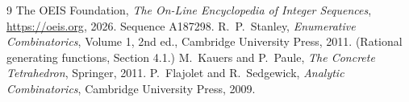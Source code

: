 \documentclass[11pt,a4paper]{article}
\theoremstyle{plain}
\theoremstyle{definition}
\begin{document}
\begin{thebibliography}{9}
 The OEIS Foundation, \emph{The On-Line Encyclopedia of Integer
Sequences}, \url{https://oeis.org}, 2026. Sequence A187298.
 R.~P.~Stanley, \emph{Enumerative Combinatorics}, Volume 1, 2nd ed.,
Cambridge University Press, 2011. (Rational generating functions, Section 4.1.)
 M.~Kauers and P.~Paule, \emph{The Concrete Tetrahedron}, Springer, 2011.
 P.~Flajolet and R.~Sedgewick, \emph{Analytic Combinatorics}, Cambridge
University Press, 2009.
\end{thebibliography}
\end{document}
